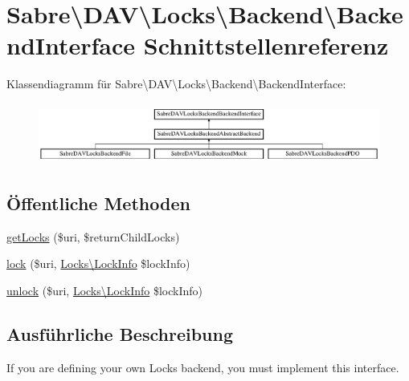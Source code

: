 \hypertarget{interface_sabre_1_1_d_a_v_1_1_locks_1_1_backend_1_1_backend_interface}{}\section{Sabre\textbackslash{}D\+AV\textbackslash{}Locks\textbackslash{}Backend\textbackslash{}Backend\+Interface Schnittstellenreferenz}
\label{interface_sabre_1_1_d_a_v_1_1_locks_1_1_backend_1_1_backend_interface}
Klassendiagramm für Sabre\textbackslash{}D\+AV\textbackslash{}Locks\textbackslash{}Backend\textbackslash{}Backend\+Interface\+:\begin{figure}[H]
\begin{center}
\leavevmode
\includegraphics[height=2.014389cm]{interface_sabre_1_1_d_a_v_1_1_locks_1_1_backend_1_1_backend_interface}
\end{center}
\end{figure}
\subsection*{Öffentliche Methoden}
\begin{DoxyCompactItemize}
\item 
\mbox{\hyperlink{interface_sabre_1_1_d_a_v_1_1_locks_1_1_backend_1_1_backend_interface_aa9b7cf37a5acdca463fef77f96599d60}{get\+Locks}} (\$uri, \$return\+Child\+Locks)
\item 
\mbox{\hyperlink{interface_sabre_1_1_d_a_v_1_1_locks_1_1_backend_1_1_backend_interface_a49409bfaeeacd965d275df670a6ad2fd}{lock}} (\$uri, \mbox{\hyperlink{class_sabre_1_1_d_a_v_1_1_locks_1_1_lock_info}{Locks\textbackslash{}\+Lock\+Info}} \$lock\+Info)
\item 
\mbox{\hyperlink{interface_sabre_1_1_d_a_v_1_1_locks_1_1_backend_1_1_backend_interface_ae575eb4b8b6ca5b5da7314d674df4cfe}{unlock}} (\$uri, \mbox{\hyperlink{class_sabre_1_1_d_a_v_1_1_locks_1_1_lock_info}{Locks\textbackslash{}\+Lock\+Info}} \$lock\+Info)
\end{DoxyCompactItemize}


\subsection{Ausführliche Beschreibung}
If you are defining your own Locks backend, you must implement this interface.

